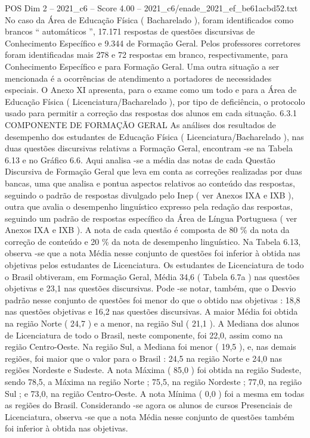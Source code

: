 \begin{textsample}{POS Dim 2 – 2021\_c6 – Score 4.00 – 2021\_c6/enade\_2021\_ef\_be61acbd52.txt}
No caso da Área de Educação Física ( Bacharelado ), foram identificados como brancos “ automáticos ”, 17.171 respostas de questões discursivas de Conhecimento Específico e 9.344 de Formação Geral.
Pelos professores corretores foram identificadas mais 278 e 72 respostas em branco, respectivamente, para Conhecimento Específico e para Formação Geral.
Uma outra situação a ser mencionada é a ocorrências de atendimento a portadores de necessidades especiais.
O Anexo XI apresenta, para o exame como um todo e para a Área de Educação Física ( Licenciatura/Bacharelado ), por tipo de deficiência, o protocolo usado para permitir a correção das respostas dos alunos em cada situação. 6.3.1 COMPONENTE DE FORMAÇÃO GERAL As análises dos resultados de desempenho dos estudantes de Educação Física ( Licenciatura/Bacharelado ), nas duas questões discursivas relativas a Formação Geral, encontram -se na Tabela 6.13 e no Gráfico 6.6.
Aqui analisa -se a média das notas de cada Questão Discursiva de Formação Geral que leva em conta as correções realizadas por duas bancas, uma que analisa e pontua aspectos relativos ao conteúdo das respostas, seguindo o padrão de respostas divulgado pelo Inep ( ver Anexos IXA e IXB ), outra que avalia o desempenho linguístico expresso pela redação das respostas, seguindo um padrão de respostas específico da Área de Língua Portuguesa ( ver Anexos IXA e IXB ).
A nota de cada questão é composta de 80 \% da nota da correção de conteúdo e 20 \% da nota de desempenho linguístico.
Na Tabela 6.13, observa -se que a nota Média nesse conjunto de questões foi inferior à obtida nas objetivas pelos estudantes de Licenciatura.
Os estudantes de Licenciatura de todo o Brasil obtiveram, em Formação Geral, Média 34,6 ( Tabela 6.7a ) nas questões objetivas e 23,1 nas questões discursivas.
Pode -se notar, também, que o Desvio padrão nesse conjunto de questões foi menor do que o obtido nas objetivas : 18,8 nas questões objetivas e 16,2 nas questões discursivas.
A maior Média foi obtida na região Norte ( 24,7 ) e a menor, na região Sul ( 21,1 ).
A Mediana dos alunos de Licenciatura de todo o Brasil, neste componente, foi 22,0, assim como na região Centro-Oeste.
Na região Sul, a Mediana foi menor ( 19,5 ), e, nas demais regiões, foi maior que o valor para o Brasil : 24,5 na região Norte e 24,0 nas regiões Nordeste e Sudeste.
A nota Máxima ( 85,0 ) foi obtida na região Sudeste, sendo 78,5, a Máxima na região Norte ; 75,5, na região Nordeste ; 77,0, na região Sul ; e 73,0, na região Centro-Oeste.
A nota Mínima ( 0,0 ) foi a mesma em todas as regiões do Brasil.
Considerando -se agora os alunos de cursos Presenciais de Licenciatura, observa -se que a nota Média nesse conjunto de questões também foi inferior à obtida nas objetivas.

\end{textsample}
